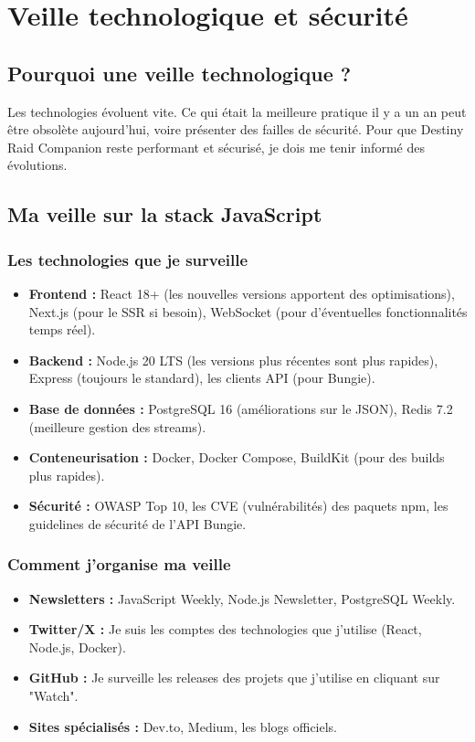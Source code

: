 \chapter{Veille technologique et sécurité}

\section{Pourquoi une veille technologique ?}

Les technologies évoluent vite. Ce qui était la meilleure pratique il y a un an peut être obsolète aujourd'hui, voire présenter des failles de sécurité. Pour que Destiny Raid Companion reste performant et sécurisé, je dois me tenir informé des évolutions.

\section{Ma veille sur la stack JavaScript}

\subsection{Les technologies que je surveille}

\begin{itemize}
    \item \textbf{Frontend :} React 18+ (les nouvelles versions apportent des optimisations), Next.js (pour le SSR si besoin), WebSocket (pour d'éventuelles fonctionnalités temps réel).
    \item \textbf{Backend :} Node.js 20 LTS (les versions plus récentes sont plus rapides), Express (toujours le standard), les clients API (pour Bungie).
    \item \textbf{Base de données :} PostgreSQL 16 (améliorations sur le JSON), Redis 7.2 (meilleure gestion des streams).
    \item \textbf{Conteneurisation :} Docker, Docker Compose, BuildKit (pour des builds plus rapides).
    \item \textbf{Sécurité :} OWASP Top 10, les CVE (vulnérabilités) des paquets npm, les guidelines de sécurité de l'API Bungie.
\end{itemize}

\subsection{Comment j'organise ma veille}

\begin{itemize}
    \item \textbf{Newsletters :} JavaScript Weekly, Node.js Newsletter, PostgreSQL Weekly.
    \item \textbf{Twitter/X :} Je suis les comptes des technologies que j'utilise (React, Node.js, Docker).
    \item \textbf{GitHub :} Je surveille les releases des projets que j'utilise en cliquant sur "Watch".
    \item \textbf{Sites spécialisés :} Dev.to, Medium, les blogs officiels.
\end{itemize}

